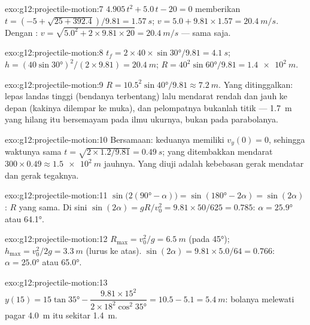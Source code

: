\begin{solution}{exo:g12:projectile-motion:7}
$4.905\,t^2 + 5.0\,t - 20 = 0$ memberikan
$t = (-5 + \sqrt{25 + 392.4})/9.81 = \qty{1.57}{s}$;
$v = 5.0 + 9.81 \times 1.57 = \qty{20.4}{m/s}$. Dengan :
$v = \sqrt{5.0^2 + 2 \times 9.81 \times 20} = \qty{20.4}{m/s}$ ---
sama saja.
\end{solution}

\begin{solution}{exo:g12:projectile-motion:8}
$t_f = 2 \times 40 \times \sin\ang{30}/9.81 = \qty{4.1}{s}$;
$h = (40\sin\ang{30})^2/(2 \times 9.81) = \qty{20.4}{m}$;
$R = 40^2 \sin\ang{60}/9.81 = \qty{1.4e2}{m}$.
\end{solution}

\begin{solution}{exo:g12:projectile-motion:9}
$R = 10.5^2\sin\ang{40}/9.81 \approx \qty{7.2}{m}$. Yang ditinggalkan:  lepas landas tinggi (bendanya terbentang) lalu mendarat rendah dan
jauh ke depan (kakinya dilempar ke muka), dan pelompatnya bukanlah titik ---
\qty{1.7}{m} yang hilang itu bersemayam pada ilmu ukurnya, bukan pada parabolanya.
\end{solution}

\begin{solution}{exo:g12:projectile-motion:10}
Bersamaan: keduanya memiliki $v_y(0) = 0$, sehingga waktunya sama
$t = \sqrt{2 \times 1.2/9.81} = \qty{0.49}{s}$; yang ditembakkan mendarat
$300 \times 0.49 \approx \qty{1.5e2}{m}$ jauhnya. Yang diuji adalah
kebebasan gerak mendatar dan gerak tegaknya.
\end{solution}

\begin{solution}{exo:g12:projectile-motion:11}
$\sin\bigl(2(\ang{90}-\alpha)\bigr) = \sin(\ang{180}-2\alpha) =
\sin(2\alpha)$: $R$ yang sama. Di sini $\sin(2\alpha) = gR/v_0^2 =
9.81 \times 50/625 = 0.785$: $\alpha = \ang{25.9}$ atau \ang{64.1}.
\end{solution}

\begin{solution}{exo:g12:projectile-motion:12}
$R_{\max} = v_0^2/g = \qty{6.5}{m}$ (pada \ang{45});
$h_{\max} = v_0^2/2g = \qty{3.3}{m}$ (lurus ke atas).
$\sin(2\alpha) = 9.81 \times 5.0/64 = 0.766$: $\alpha = \ang{25.0}$
atau \ang{65.0}.
\end{solution}

\begin{solution}{exo:g12:projectile-motion:13}
$y(15) = 15\tan\ang{35} - \dfrac{9.81 \times 15^2}
{2 \times 18^2 \cos^2\ang{35}} = 10.5 - 5.1 = \qty{5.4}{m}$:
bolanya melewati pagar \qty{4.0}{m} itu sekitar \qty{1.4}{m}.
\end{solution}

